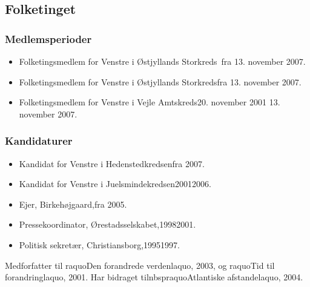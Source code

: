 \documentclass[11pt, a4paper]{awesome-cv}
\begin{document}
\begin{cvletter}
\subsection*{Folketinget}
\subsubsection*{Medlemsperioder}
\begin{itemize}
\item Folketingsmedlem for Venstre i Østjyllands Storkreds fra 13. november 2007.
\item Folketingsmedlem for Venstre i Østjyllands Storkredsfra 13. november 2007.
\item Folketingsmedlem for Venstre i Vejle Amtskreds20. november 2001  13. november 2007.
\end{itemize}
\subsubsection*{Kandidaturer}
\begin{itemize}
\item Kandidat for Venstre i Hedenstedkredsenfra 2007.
\item Kandidat for Venstre i Juelsmindekredsen20012006.
\end{itemize}
\begin{itemize}
\item Ejer, Birkehøjgaard,fra 2005.
\item Pressekoordinator, Ørestadsselskabet,19982001.
\item Politisk sekretær, Christiansborg,19951997.
\end{itemize}
Medforfatter til raquoDen forandrede verdenlaquo, 2003, og raquoTid til forandringlaquo, 2001. Har bidraget tilnbspraquoAtlantiske afstandelaquo, 2004.

\end{cvletter}
\end{document}
